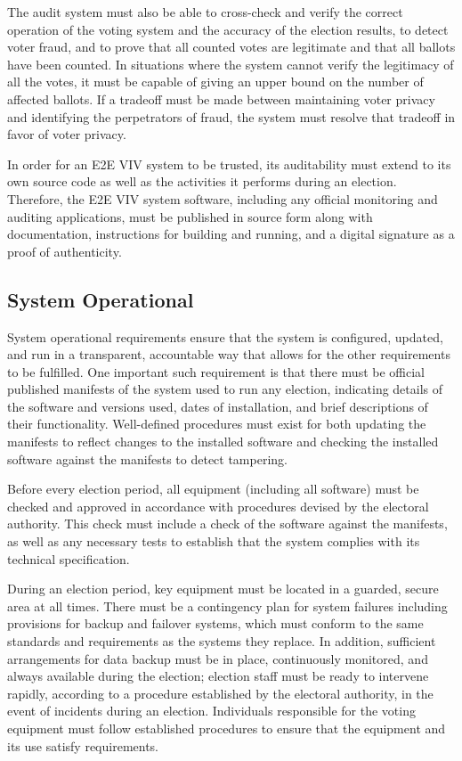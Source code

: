 The audit system must also be able to cross-check and verify the
correct operation of the voting system and the accuracy of the
election results, to detect voter fraud, and to prove that all counted
votes are legitimate and that all ballots have been counted. In
situations where the system cannot verify the legitimacy of all the
votes, it must be capable of giving an upper bound on the number of
affected ballots. If a tradeoff must be made between maintaining voter
privacy and identifying the perpetrators of fraud, the system must
resolve that tradeoff in favor of voter privacy.

In order for an E2E VIV system to be trusted, its auditability must
extend to its own source code as well as the activities it performs
during an election. Therefore, the E2E VIV system software, including
any official monitoring and auditing applications, must be published
in source form along with documentation, instructions for building and
running, and a digital signature as a proof of authenticity.

\subsection{System Operational}

System operational requirements ensure that the system is configured,
updated, and run in a transparent, accountable way that allows for the
other requirements to be fulfilled. One important such requirement is
that there must be official published manifests of the system used to
run any election, indicating details of the software and versions
used, dates of installation, and brief descriptions of their
functionality. Well-defined procedures must exist for both updating
the manifests to reflect changes to the installed software and
checking the installed software against the manifests to detect
tampering.

Before every election period, all equipment (including all software)
must be checked and approved in accordance with procedures devised by
the electoral authority. This check must include a check of the
software against the manifests, as well as any necessary tests to
establish that the system complies with its technical specification.

During an election period, key equipment must be located in a guarded,
secure area at all times. There must be a contingency plan for system
failures including provisions for backup and failover systems, which
must conform to the same standards and requirements as the systems
they replace. In addition, sufficient arrangements for data backup
must be in place, continuously monitored, and always available during
the election; election staff must be ready to intervene rapidly,
according to a procedure established by the electoral authority, in
the event of incidents during an election. Individuals responsible for
the voting equipment must follow established procedures to ensure that
the equipment and its use satisfy requirements.
 
